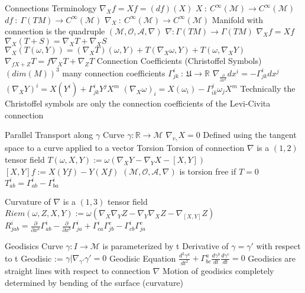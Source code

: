 \documentclass[14pt]{extarticle}
\begin{document}
\begin{outline}
		\1	Connections
			\2	Terminology
				\3	$\nabla_Xf = Xf = (df)(X)$
				\3	$X~:~C^{\infty}(\mathcal{M}) \rightarrow C^{\infty}(\mathcal{M})$
				\3	$df~:~\Gamma(TM) \rightarrow C^{\infty}(\mathcal{M})$
				\3	$\nabla_X~:~C^{\infty}(\mathcal{M}) \rightarrow C^{\infty}(\mathcal{M})$
			\2	Manifold with connection is the quadruple $(\mathcal{M},\mathcal{O},\mathcal{A},\nabla)$
				\3	$\nabla : \Gamma(TM) \rightarrow \Gamma(TM)$
				\3	$\nabla_X f = Xf$
				\3	$\nabla_X(T + S) = \nabla_XT + \nabla_XS$
				\3	$\nabla_X(T(\omega,Y)) = (\nabla_XT)(\omega,Y) + T(\nabla_X\omega,Y) + T(\omega,\nabla_XY)$
				\3	$\nabla_{fX + Z}T = f\nabla_XT + \nabla_ZT$
			\2	Connection Coefficients (Christoffel Symbols)
				\3	$(dim(M))^3$ many connection coefficients
				\3	$\Gamma^i_{jk}~:~\mathfrak{U} \rightarrow \mathbb{R}$
				\3	$\nabla_{\frac{\partial}{\partial x^k}}dx^i = -\Gamma^i_{jk}dx^j$
				\3	$(\nabla_XY)^i = X(Y^i) + \Gamma^i_{jk}Y^jX^m$
				\3	$(\nabla_X\omega)_i = X(\omega_i) - \Gamma^j_{ik}\omega_jX^m$
				\3	Technically the Christoffel symbols are only the connection coefficients of the Levi-Civita connection

		\1	Parallel Transport along $\gamma$
			\2	Curve $\gamma : \mathbb{R} \rightarrow \mathcal{M}$	
			\2	$\nabla_{v_{\gamma}}X = 0$
			\2	Defined using the tangent space to a curve applied to a vector
		\1	Torsion
			\2	Torsion of connection $\nabla$ is a $(1,2)$ tensor field
			\2	$T(\omega,X,Y) := \omega(\nabla_XY - \nabla_YX - [X,Y])$
				\3	$[X,Y]f := X(Yf) - Y(Xf)$
			\2	$(\mathcal{M},\mathcal{O},\mathcal{A},\nabla)$ is torsion free if $T = 0$
			\2	$T^i_{ab} = \Gamma^i_{ab} - \Gamma^i_{ba}$
		
		\1	Curvature of $\nabla$ is a $(1,3)$ tensor field
			\2	$Riem(\omega,Z,X,Y) := \omega(\nabla_X\nabla_YZ - \nabla_Y\nabla_XZ - \nabla_{[X,Y]}Z)$
			\2	$R^i_{jab} = \frac{\partial}{\partial x^a}\Gamma^i_{ab} - 
					\frac{\partial}{\partial x^b}\Gamma^i_{ja} + 
					\Gamma^i_{ca}\Gamma^c_{jb} - \Gamma^i_{cb}\Gamma^c_{ja}$
		
		\1	Geodisics
			\2	Curve $\gamma : I \rightarrow \mathcal{M}$ is parameterized by t
			\2	Derivative of $\gamma = \gamma'$ with respect to t
			\2	Geodisic := $\gamma | \nabla_{\gamma'} \gamma' = 0$
			\2	Geodisic Equation
				\3	$\frac{d^2 \gamma^a}{dt^2} + \Gamma^a_{bc}\frac{d \gamma^b}{dt}\frac{d \gamma^c}{dt} = 0$
			\2	Geodisics are straight lines with respect to connection $\nabla$
			\2	Motion of geodisics completely determined by bending of the surface (curvature)


\end{outline}
\end{document}

